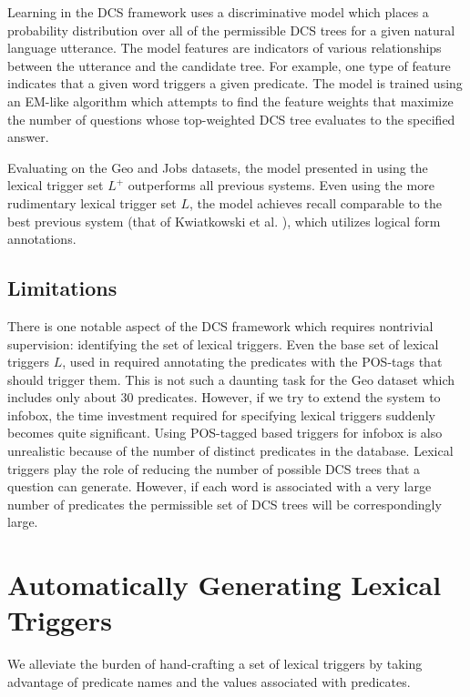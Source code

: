 \documentclass[11pt]{article}
\begin{document}
Learning in the DCS framework uses a discriminative model which places a
probability distribution over
all of the permissible DCS trees for a given natural language utterance. The
model features are indicators of various relationships between the utterance and
the candidate tree. For example, one type of feature indicates that a given word
triggers a given predicate. The model is trained using an EM-like algorithm
which attempts to find the feature weights that maximize the number of questions
whose top-weighted DCS tree evaluates to the specified answer. 

Evaluating on the {\sc Geo} and {\sc Jobs} datasets, the model presented in
\cite{LJK11} using the lexical trigger set $L^+$ outperforms all previous systems.  
Even using the more rudimentary lexical trigger set $L$, the model achieves
recall comparable to the best previous system (that of Kwiatkowski et al.
\cite{KZGS10}), which utilizes logical form annotations.  

\subsection{Limitations} 

There is one notable aspect of the DCS framework which requires nontrivial 
supervision: identifying the set of lexical triggers. 
Even the base set of lexical triggers $L$, used in
\cite{LJK11} required annotating the predicates with the POS-tags that should
trigger them. This is not such a daunting task for the {\sc Geo} dataset which
includes only about 30 predicates. However, if we try to extend the system to
{\sc infobox}, the time investment required for specifying lexical triggers 
suddenly becomes quite significant. Using POS-tagged based triggers for {\sc
infobox} is also unrealistic because of the number of distinct predicates in the
database. Lexical triggers play the role of reducing the number of possible DCS
trees that a question can generate. However, if each word is associated with a
very large number of predicates the permissible set of DCS trees will be
correspondingly large.  

\section{Automatically Generating Lexical Triggers}

We alleviate the burden of hand-crafting a set of lexical triggers by taking
advantage of predicate names and the values associated with predicates. 
 
\end{document}

